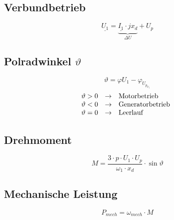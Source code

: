 \subsection{Verbundbetrieb}
\[ \underline{U_1} = \underbrace{\underline{I_1} \cdot j x_d}_{\Delta U} + U_p \]

\subsection{Polradwinkel $\vartheta$}
\[ \vartheta = \varphi U_1 - \varphi_{U_{p_{U_1}}} \]
\[ \begin{array}{@{}lll}
\vartheta > 0 & \rightarrow & \text{Motorbetrieb} \\
\vartheta < 0 & \rightarrow & \text{Generatorbetrieb} \\
\vartheta = 0 & \rightarrow & \text{Leerlauf} \\
\end{array} \]

\subsection{Drehmoment}
\[ M = \frac{3 \cdot p \cdot U_1 \cdot U_p}{\omega_1 \cdot x_d} 
\cdot \sin{\vartheta} \]

\subsection{Mechanische Leistung}
\[ P_{mech} = \omega_{mech} \cdot M \]

